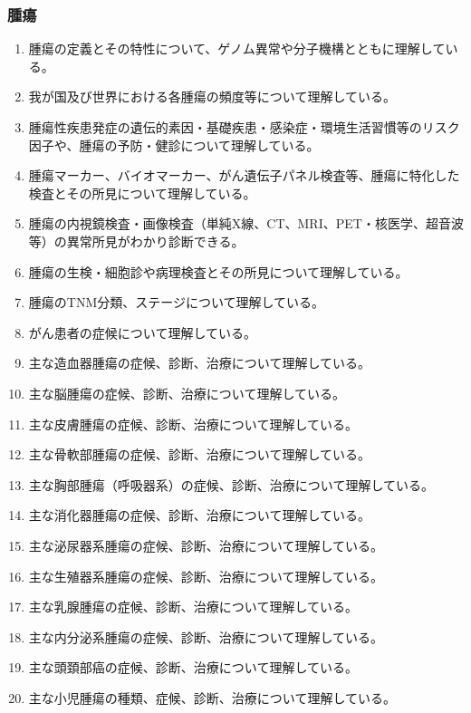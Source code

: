 \hypertarget{ux816bux760d}{%
\subsubsection{腫瘍}\label{ux816bux760d}}

\begin{enumerate}
\def\labelenumi{\arabic{enumi}.}
\tightlist
\item
  腫瘍の定義とその特性について、ゲノム異常や分子機構とともに理解している。
\item
  我が国及び世界における各腫瘍の頻度等について理解している。
\item
  腫瘍性疾患発症の遺伝的素因・基礎疾患・感染症・環境生活習慣等のリスク因子や、腫瘍の予防・健診について理解している。
\item
  腫瘍マーカー、バイオマーカー、がん遺伝子パネル検査等、腫瘍に特化した検査とその所見について理解している。
\item
  腫瘍の内視鏡検査・画像検査（単純X線、CT、MRI、PET・核医学、超音波等）の異常所見がわかり診断できる。
\item
  腫瘍の生検・細胞診や病理検査とその所見について理解している。
\item
  腫瘍のTNM分類、ステージについて理解している。
\item
  がん患者の症候について理解している。
\item
  主な造血器腫瘍の症候、診断、治療について理解している。
\item
  主な脳腫瘍の症候、診断、治療について理解している。
\item
  主な皮膚腫瘍の症候、診断、治療について理解している。
\item
  主な骨軟部腫瘍の症候、診断、治療について理解している。
\item
  主な胸部腫瘍（呼吸器系）の症候、診断、治療について理解している。
\item
  主な消化器腫瘍の症候、診断、治療について理解している。
\item
  主な泌尿器系腫瘍の症候、診断、治療について理解している。
\item
  主な生殖器系腫瘍の症候、診断、治療について理解している。
\item
  主な乳腺腫瘍の症候、診断、治療について理解している。
\item
  主な内分泌系腫瘍の症候、診断、治療について理解している。
\item
  主な頭頚部癌の症候、診断、治療について理解している。
\item
  主な小児腫瘍の種類、症候、診断、治療について理解している。

\end{enumerate}
